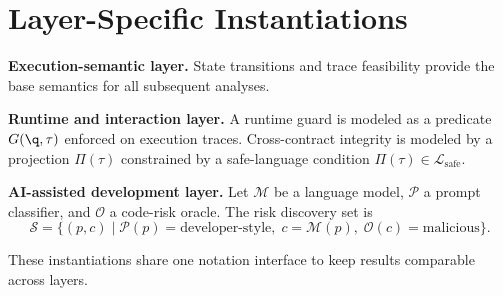 \section{Layer-Specific Instantiations}

\noindent \textbf{Execution-semantic layer.}
State transitions and trace feasibility provide the base semantics for all subsequent analyses.

\noindent \textbf{Runtime and interaction layer.}
A runtime guard is modeled as a predicate $G(\q,\tau)$ enforced on execution traces.
Cross-contract integrity is modeled by a projection $\Pi(\tau)$ constrained by a safe-language condition $\Pi(\tau)\in\mathcal{L}_{\text{safe}}$.

\noindent \textbf{AI-assisted development layer.}
Let $\mathcal{M}$ be a language model, $\mathcal{P}$ a prompt classifier, and $\mathcal{O}$ a code-risk oracle.
The risk discovery set is
\[
\mathcal{S}=\{(p,c)\mid \mathcal{P}(p)=\text{developer-style},\; c=\mathcal{M}(p),\; \mathcal{O}(c)=\text{malicious}\}.
\]

These instantiations share one notation interface to keep results comparable across layers.
